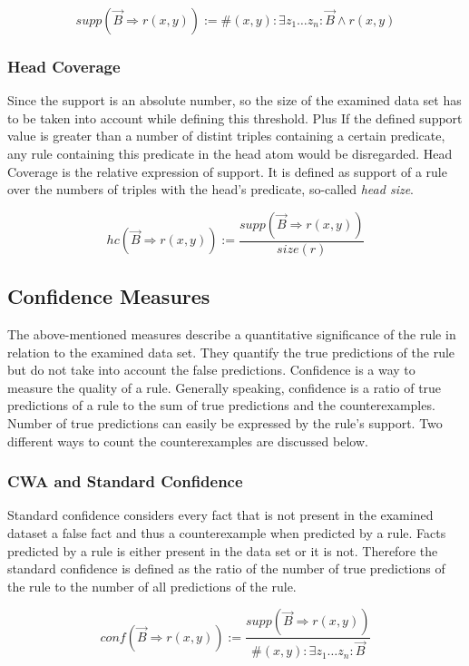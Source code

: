 $$ supp(\vec{B} \Rightarrow r(x,y)) := \# (x,y): \exists z_{1}\ldots z_{n}: \vec{B} \land r(x,y) $$

\subsubsection{Head Coverage}

Since the support is an absolute number, so the size of the examined data set has to be taken into account while defining this threshold. Plus If the defined support value is greater than a number of distint triples containing a certain predicate, any rule containing this predicate in the head atom would be disregarded. Head Coverage is the relative expression of support. It is defined as support of a rule over the numbers of triples with the head's predicate, so-called \textit{head size}.

$$ hc(\vec{B} \Rightarrow r(x,y)) := \frac{supp(\vec{B} \Rightarrow r(x,y))}{size(r)}  $$

\subsection{Confidence Measures}

The above-mentioned measures describe a quantitative significance of the rule in relation to the examined data set. They quantify the true predictions of the rule but do not take into account the false predictions. Confidence is a way to measure the quality of a rule. Generally speaking, confidence is a ratio of true predictions of a rule to the sum of true predictions and the counterexamples. Number of true predictions can easily be expressed by the rule's support. Two different ways to count the counterexamples are discussed below.

\subsubsection{CWA and Standard Confidence}

Standard confidence considers every fact that is not present in the examined dataset a false fact and thus a counterexample when predicted by a rule. Facts predicted by a rule is either present in the data set or it is not. Therefore the standard confidence is defined as the ratio of the number of true predictions of the rule to the number of all predictions of the rule.

$$ conf(\vec{B} \Rightarrow r(x,y)) := \frac{supp(\vec{B} \Rightarrow r(x,y))}{\# (x,y): \exists z_{1}\ldots z_{n}: \vec{B}} $$

